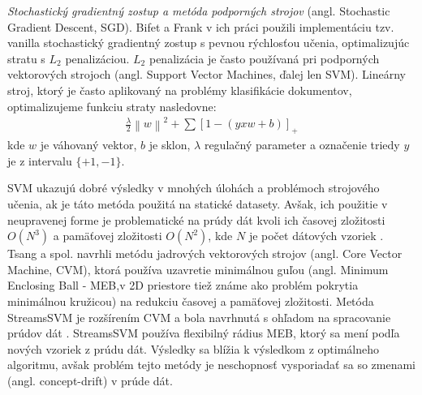 \textit{Stochastický gradientný zostup a metóda podporných strojov} (angl. Stochastic Gradient Descent, SGD). Bifet a Frank v ich práci použili implementáciu tzv. vanilla stochastický gradientný zostup s pevnou rýchlosťou učenia, optimalizujúc stratu s $L_2$ penalizáciou. $L_2$ penalizácia je často používaná pri podporných vektorových strojoch (angl. Support Vector Machines, ďalej len SVM). Lineárny stroj, ktorý je často aplikovaný na problémy klasifikácie dokumentov, optimalizujeme funkciu straty nasledovne:
\begin{align*}
\frac{\lambda }{2}\left \| w \right \|^{2}+\sum [1-(yxw + b)]_{+}
\end{align*}
kde $w$ je váhovaný vektor, $b$ je sklon, $\lambda$ regulačný parameter a označenie triedy $y$ je z intervalu $\{+1, -1\}$.
\par
SVM ukazujú dobré výsledky v mnohých úlohách a problémoch strojového učenia, ak je táto metóda použitá na statické datasety. Avšak, ich použitie v neupravenej forme je problematické na prúdy dát kvoli ich časovej zložitosti $O(N^3)$ a pamäťovej zložitosti $O(N^2)$, kde $N$ je počet dátových vzoriek \citep{nguyen2015survey}. Tsang a spol. navrhli metódu jadrových vektorových strojov (angl. Core Vector Machine, CVM), ktorá používa uzavretie minimálnou guľou (angl. Minimum Enclosing Ball - MEB,v 2D priestore tiež známe ako problém pokrytia minimálnou kružicou) na redukciu časovej a pamäťovej zložitosti. Metóda StreamsSVM je rozšírením CVM a bola navrhnutá s ohľadom na spracovanie prúdov dát \citep{rai2009streamed}. StreamsSVM používa flexibilný rádius MEB, ktorý sa mení podľa nových vzoriek z prúdu dát. Výsledky sa blížia k výsledkom z optimálneho algoritmu, avšak problém tejto metódy je neschopnosť vysporiadať sa so zmenami (angl. concept-drift) v prúde dát.


